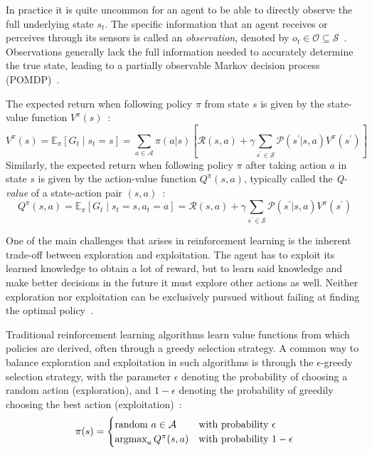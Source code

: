 In practice it is quite uncommon for an agent to be able to directly observe the full underlying state $s_t$.
The specific information that an agent receives or perceives through its sensors is called an \textit{observation}, denoted by $o_t \in \mathcal{O} \subseteq \mathcal{S}$~\cite{sutton2018rl,kaelbling1998pomdp}.
Observations generally lack the full information needed to accurately determine the true state, leading to a partially observable Markov decision process (POMDP)~\cite{kaelbling1998pomdp}.

The expected return when following policy $\pi$ from state $s$ is given by the state-value function $V^\pi(s)$~\cite{sutton2018rl,stefano2024marl}:
\begin{equation}
    V^\pi(s) =  \mathbb{E}_\pi[G_t \mid s_t=s] = \sum_{a \in \mathcal{A}} \pi(a|s) \left[ \mathcal{R}(s, a) + \gamma \sum_{s^\prime \in \mathcal{S}} \mathcal{P}(s^\prime | s, a) V^\pi(s^\prime) \right]
\end{equation}
Similarly, the expected return when following policy $\pi$ after taking action $a$ in state $s$ is given by the action-value function $Q^\pi(s, a)$, typically called the \textit{Q-value} of a state-action pair $(s, a)$~\cite{sutton2018rl,stefano2024marl}:
\begin{equation}
    Q^\pi(s, a) = \mathbb{E}_\pi[G_t \mid s_t=s, a_t=a] = \mathcal{R}(s, a) + \gamma \sum_{s^\prime \in \mathcal{S}} \mathcal{P}(s^\prime | s, a) V^\pi(s^\prime)
\end{equation}

One of the main challenges that arises in reinforcement learning is the inherent trade-off between exploration and exploitation.
The agent has to exploit its learned knowledge to obtain a lot of reward, but to learn said knowledge and make better decisions in the future it must explore other actions as well.
Neither exploration nor exploitation can be exclusively pursued without failing at finding the optimal policy~\cite{sutton1999rl}.

Traditional reinforcement learning algorithms learn value functions from which policies are derived, often through a greedy selection strategy.
A common way to balance exploration and exploitation in such algorithms is through the $\epsilon$-greedy selection strategy, with the parameter $\epsilon$ denoting the probability of choosing a random action (exploration), and $1 - \epsilon$ denoting the probability of greedily choosing the best action (exploitation)~\cite{sutton2018rl,sutton1999rl,stefano2024marl}:
\begin{equation}
    \pi(s) = 
    \begin{cases}
        \text{random } a \in \mathcal{A} & \text{with probability } \epsilon \\
        \operatorname*{argmax}_a Q^\pi(s, a) & \text{with probability } 1 - \epsilon
    \end{cases}
\end{equation}

